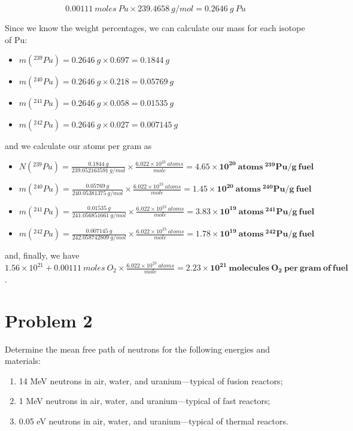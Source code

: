 \documentclass{article}
\begin{document}
$$0.00111~moles~Pu \times 239.4658~g/mol = 0.2646~g~Pu$$

Since we know the weight percentages, we can calculate our mass for each isotope of Pu:

\begin{itemize}
\item $m(^{239}Pu) =  0.2646~g \times 0.697 = 0.1844~g$
\item $m(^{240}Pu) =  0.2646~g \times 0.218 = 0.05769~g$
\item $m(^{241}Pu) =  0.2646~g \times 0.058 = 0.01535~g$
\item $m(^{242}Pu) =  0.2646~g \times 0.027 = 0.007145~g$
\end{itemize}

and we calculate our atoms per gram as

\begin{itemize}
\item $N(^{239}Pu) =  \frac{0.1844~g}{239.052163591~g/mol}\times \frac{6.022 \times 10^{23}~atoms}{mole} = \mathbf{4.65 \times 10^{20}~atoms~^{239}Pu/g~fuel}$
\item $m(^{240}Pu) =  \frac{0.05769~g}{240.05381375~g/mol}\times \frac{6.022 \times 10^{23}~atoms}{mole} = \mathbf{1.45\times 10^{20}~atoms~^{240}Pu/g~fuel}$
\item $m(^{241}Pu) =  \frac{0.01535~g}{241.056851661~g/mol}\times \frac{6.022 \times 10^{23}~atoms}{mole} = \mathbf{3.83\times 10^{19}~atoms~^{241}Pu/g~fuel}$
\item $m(^{242}Pu) =  \frac{0.007145~g}{242.058742809~g/mol}\times \frac{6.022 \times 10^{23}~atoms}{mole} = \mathbf{1.78\times 10^{19}~atoms~^{242}Pu/g~fuel}$
\end{itemize}

and, finally, we have $1.56 \times 10^{21} + 0.00111~moles~O_{2} \times \frac{6.022 \times 10^{23}~atoms}{mole} = \mathbf{2.23 \times 10^{21}~molecules~O_{2}~per~gram~of~fuel}$.

\hrulefill

\section*{Problem 2}

Determine the mean free path of neutrons for the following energies and materials:

\begin{enumerate}[label=(\alph*)]
\item 14 MeV neutrons in air, water, and uranium—typical of fusion reactors;
\item 1 MeV neutrons in air, water, and uranium—typical of fast reactors;
\item 0.05 eV neutrons in air, water, and uranium—typical of thermal reactors.
\end{enumerate}
\end{document}
